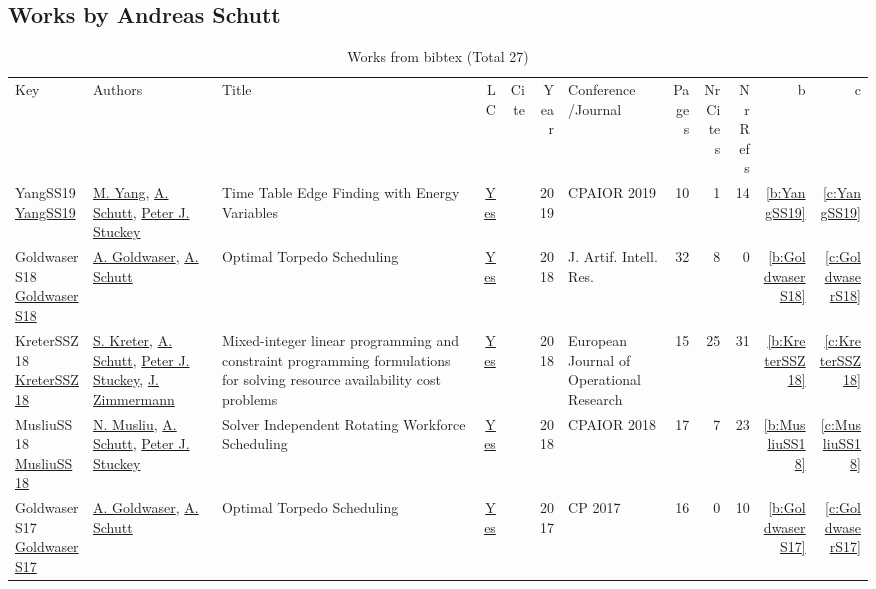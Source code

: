 \subsection{Works by Andreas Schutt}
\label{sec:a125}
{\scriptsize
\begin{longtable}{>{\raggedright\arraybackslash}p{3cm}>{\raggedright\arraybackslash}p{6cm}>{\raggedright\arraybackslash}p{6.5cm}rrrp{2.5cm}rrrrr}
\rowcolor{white}\caption{Works from bibtex (Total 27)}\\ \toprule
\rowcolor{white}Key & Authors & Title & LC & Cite & Year & \shortstack{Conference\\/Journal} & Pages & \shortstack{Nr\\Cites} & \shortstack{Nr\\Refs} & b & c \\ \midrule\endhead
\bottomrule
\endfoot
YangSS19 \href{https://doi.org/10.1007/978-3-030-19212-9\_42}{YangSS19} & \hyperref[auth:a312]{M. Yang}, \hyperref[auth:a125]{A. Schutt}, \hyperref[auth:a126]{Peter J. Stuckey} & Time Table Edge Finding with Energy Variables & \href{works/YangSS19.pdf}{Yes} & \cite{YangSS19} & 2019 & CPAIOR 2019 & 10 & 1 & 14 & \ref{b:YangSS19} & \ref{c:YangSS19}\\
GoldwaserS18 \href{https://doi.org/10.1613/jair.1.11268}{GoldwaserS18} & \hyperref[auth:a195]{A. Goldwaser}, \hyperref[auth:a125]{A. Schutt} & Optimal Torpedo Scheduling & \href{works/GoldwaserS18.pdf}{Yes} & \cite{GoldwaserS18} & 2018 & J. Artif. Intell. Res. & 32 & 8 & 0 & \ref{b:GoldwaserS18} & \ref{c:GoldwaserS18}\\
KreterSSZ18 \href{https://doi.org/10.1016/j.ejor.2017.10.014}{KreterSSZ18} & \hyperref[auth:a124]{S. Kreter}, \hyperref[auth:a125]{A. Schutt}, \hyperref[auth:a126]{Peter J. Stuckey}, \hyperref[auth:a804]{J. Zimmermann} & Mixed-integer linear programming and constraint programming formulations for solving resource availability cost problems & \href{works/KreterSSZ18.pdf}{Yes} & \cite{KreterSSZ18} & 2018 & European Journal of Operational Research & 15 & 25 & 31 & \ref{b:KreterSSZ18} & \ref{c:KreterSSZ18}\\
MusliuSS18 \href{https://doi.org/10.1007/978-3-319-93031-2\_31}{MusliuSS18} & \hyperref[auth:a45]{N. Musliu}, \hyperref[auth:a125]{A. Schutt}, \hyperref[auth:a126]{Peter J. Stuckey} & Solver Independent Rotating Workforce Scheduling & \href{works/MusliuSS18.pdf}{Yes} & \cite{MusliuSS18} & 2018 & CPAIOR 2018 & 17 & 7 & 23 & \ref{b:MusliuSS18} & \ref{c:MusliuSS18}\\
GoldwaserS17 \href{https://doi.org/10.1007/978-3-319-66158-2\_22}{GoldwaserS17} & \hyperref[auth:a195]{A. Goldwaser}, \hyperref[auth:a125]{A. Schutt} & Optimal Torpedo Scheduling & \href{works/GoldwaserS17.pdf}{Yes} & \cite{GoldwaserS17} & 2017 & CP 2017 & 16 & 0 & 10 & \ref{b:GoldwaserS17} & \ref{c:GoldwaserS17}\\

\end{longtable}}
